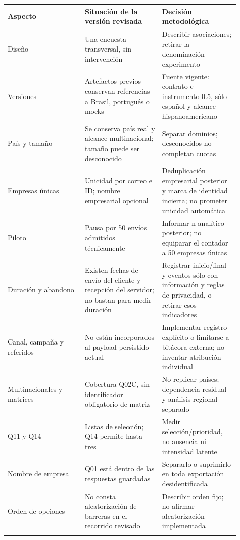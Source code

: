 \documentclass[12pt,letterpaper]{article}
\begin{document}
\begingroup\small{}\setlength{\tabcolsep}{4pt}\begin{longtable}{>{\raggedright\arraybackslash}p{0.303\linewidth}>{\raggedright\arraybackslash}p{0.303\linewidth}>{\raggedright\arraybackslash}p{0.303\linewidth}}
\toprule
\textbf{Aspecto} & \textbf{Situación de la versión revisada} & \textbf{Decisión metodológica} \\ \midrule\endhead
Diseño & Una encuesta transversal, sin intervención & Describir asociaciones; retirar la denominación experimento \\ \addlinespace[5pt]
Versiones & Artefactos previos conservan referencias a Brasil, portugués o mocks & Fuente vigente: contrato e instrumento 0.5, sólo español y alcance hispanoamericano \\ \addlinespace[5pt]
País y tamaño & Se conserva país real y alcance multinacional; tamaño puede ser desconocido & Separar dominios; desconocidos no completan cuotas \\ \addlinespace[5pt]
Empresas únicas & Unicidad por correo e ID; nombre empresarial opcional & Deduplicación empresarial posterior y marca de identidad incierta; no prometer unicidad automática \\ \addlinespace[5pt]
Piloto & Pausa por 50 envíos admitidos técnicamente & Informar n analítico posterior; no equiparar el contador a 50 empresas únicas \\ \addlinespace[5pt]
Duración y abandono & Existen fechas de envío del cliente y recepción del servidor; no bastan para medir duración & Registrar inicio/final y eventos sólo con información y reglas de privacidad, o retirar esos indicadores \\ \addlinespace[5pt]
Canal, campaña y referidos & No están incorporados al payload persistido actual & Implementar registro explícito o limitarse a bitácora externa; no inventar atribución individual \\ \addlinespace[5pt]
Multinacionales y matrices & Cobertura Q02C, sin identificador obligatorio de matriz & No replicar países; dependencia residual y análisis regional separado \\ \addlinespace[5pt]
Q11 y Q14 & Listas de selección; Q14 permite hasta tres & Medir selección/prioridad, no ausencia ni intensidad latente \\ \addlinespace[5pt]
Nombre de empresa & Q01 está dentro de las respuestas guardadas & Separarlo o suprimirlo en toda exportación desidentificada \\ \addlinespace[5pt]
Orden de opciones & No consta aleatorización de barreras en el recorrido revisado & Describir orden fijo; no afirmar aleatorización implementada \\ \addlinespace[5pt]

\end{longtable}
\end{document}
